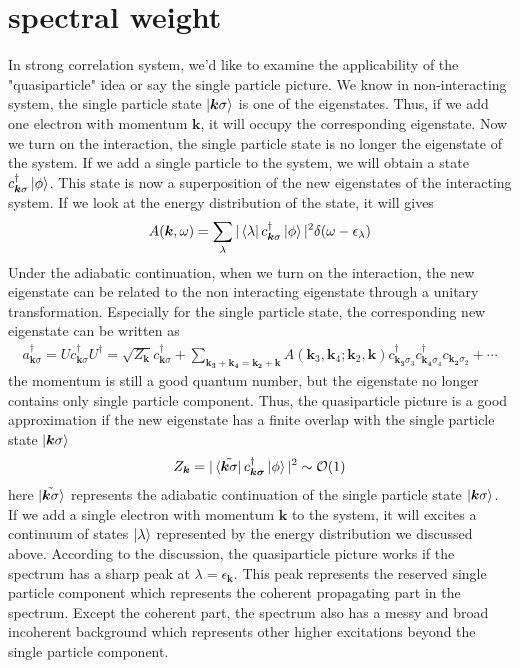 \documentclass{article}
\begin{document}
\section{spectral weight}
In strong correlation system, we'd like to examine the applicability of the "quasiparticle" idea or say the single particle picture.
We know in non-interacting system, the single particle state $\ket{\bm{k}\sigma}$ is one of the eigenstates. Thus, if we add one electron with momentum $\bm{k}$, 
it will occupy the corresponding eigenstate. Now we turn on the interaction, the single particle state is no longer the eigenstate of the system. If we add a single particle to the system, we will obtain a state
$c_{\bm{k}\sigma}^{\dagger}\ket{\phi}$. This state is now a superposition of the new eigenstates of the interacting system. If we look at the energy distribution of the state, it will gives
\begin{align*}
    A(\bm{k},\omega) = \sum_{\lambda}|\bra{\lambda}c_{\bm{k}\sigma}^{\dagger}\ket{\phi}|^2\delta(\omega-\epsilon_{\lambda})
\end{align*}
Under the adiabatic continuation, when we turn on the interaction, the new eigenstate can be related to the 
non interacting eigenstate through a unitary transformation. Especially for the single particle state, the corresponding new eigenstate can be written as
\begin{align*}
    a_{\bm{k}\sigma}^{\dagger} = Uc_{\bm{k}\sigma}^{\dagger}U^{\dagger} = \sqrt{Z_{\bm{k}}}c_{\bm{k}\sigma}^{\dagger}+\sum_{\bm{k_3}+\bm{k_4} = \bm{k_2}+\bm{k}}A(\bm{k}_3,\bm{k}_4;\bm{k}_2,\bm{k})c^{\dagger}_{\bm{k_3}\sigma_3}c^{\dagger}_{\bm{k_4}\sigma_4}c_{\bm{k_2}\sigma_2}+\cdots
\end{align*}
the momentum is still a good quantum number, but the eigenstate no longer contains only single particle component. Thus, the quasiparticle picture is a good approximation if the new eigenstate has a finite overlap with the single particle state $\ket{\bm{k}\sigma}$ 
\begin{align*}
    Z_{\bm{k}} = |\bra{\tilde{\bm{k}\sigma}}c_{\bm{k\sigma}}^{\dagger}\ket{\phi}|^2 \sim \mathcal{O}(1) 
\end{align*}  
here $\ket{\tilde{\bm{k}\sigma}}$ represents the adiabatic continuation of the single particle state $\ket{\bm{k}\sigma}$. If we add a single electron with momentum $\bm{k}$ to the system, it will excites a continuum of states $\ket{\lambda}$ represented by the energy distribution we discussed above. 
According to the discussion, the quasiparticle picture works if the spectrum has a sharp peak at $\lambda = \epsilon_{\bm{k}}$. This peak represents the reserved single particle component which represents the coherent propagating part in the spectrum. Except the coherent part, the spectrum also has  a messy and broad incoherent background which 
represents other higher excitations beyond the single particle component. 
\end{document}
